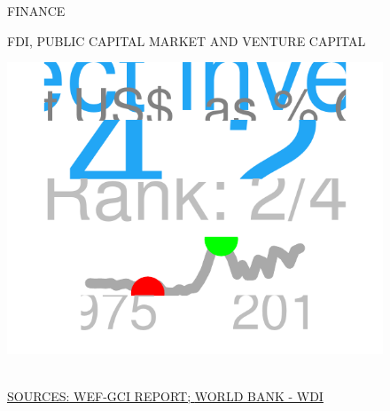 \documentclass{article}\usepackage[]{graphicx}\usepackage[]{color}
\makeatletter
\def\maxwidth{ %
  \ifdim\Gin@nat@width>\linewidth
    \linewidth
  \else
    \Gin@nat@width
  \fi
}
\makeatother
\begin{document}
\begin{figure}
\vspace*{-27.5cm}
\hspace*{+1cm}
\begin{minipage}[c]{0.95\textwidth}
  \begin{minipage}[c]{0.95\textwidth}
    \begin{flushleft}  
     \Large{\textcolor[HTML]{22A6F5}{FINANCE}}
    \end{flushleft} 
     \small{\textcolor[HTML]{818181}{FDI, PUBLIC CAPITAL MARKET AND VENTURE CAPITAL}}
      \\[4pt]
      \begin{minipage}[c]{0.33\textwidth}  


{\centering \includegraphics[width=\maxwidth]{figure/figure_sparkline_Fin1-1} 

}



      \\[4pt]
      \hspace{4ex}\scriptsize{\href{http://www3.weforum.org/docs/gcr/2015-2016/GCI_Dataset_2006-2015.xlsx}{\textcolor[HTML]{22A6F5}{SOURCES: WEF-GCI REPORT; }}\href{http://data.worldbank.org}{\textcolor[HTML]{22A6F5}{WORLD BANK - WDI}}}
      \end{minipage}
      \begin{minipage}[c]{0.33\textwidth}



\end{minipage}
\end{minipage}
\end{minipage}
\end{figure}
\end{document}
